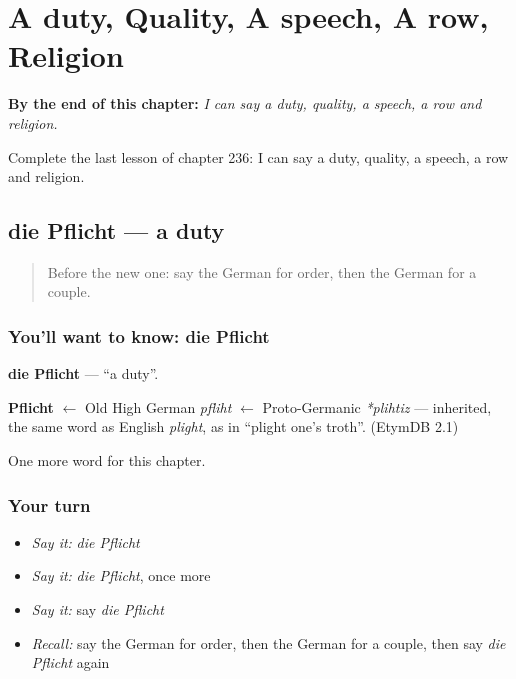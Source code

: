
\chapter{A duty, Quality, A speech, A row, Religion}
\label{ch:ge-a-duty-quality-a-speech-a-row-religion}

\begin{chapteropening}
\textbf{By the end of this chapter:} \emph{I can say a duty, quality, a speech, a row and religion.}

Complete the last lesson of chapter 236: I can say a duty, quality, a speech, a row and religion.
\end{chapteropening}

\section[die Pflicht]{die Pflicht — a duty}

\label{lesson:GE-C236-pflicht}



\begin{quote}
Before the new one: say the German for order, then the German for a couple.
\end{quote}

\subsection*{You'll want to know: die Pflicht}
\textbf{die Pflicht} — \textquotedblleft{}a duty\textquotedblright{}.

\begin{cousinweb}
\textbf{Pflicht} $\leftarrow$ Old High German \emph{pfliht} $\leftarrow$ Proto-Germanic \emph{*plihtiz} — inherited, the same word as English \emph{plight}, as in \textquotedblleft{}plight one's troth\textquotedblright{}. (EtymDB 2.1)
\end{cousinweb}

\begin{grammarlens}[title={What you've built}]
One more word for this chapter.
\end{grammarlens}

\subsection*{Your turn}
\begin{itemize}
\raggedright
  \item \emph{Say it:} \emph{die Pflicht}
  \item \emph{Say it:} \emph{die Pflicht}, once more
  \item \emph{Say it:} say \emph{die Pflicht}
  \item \emph{Recall:} say the German for order, then the German for a couple, then say \emph{die Pflicht} again
\end{itemize}

